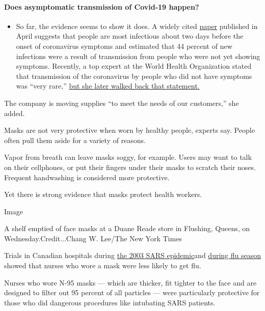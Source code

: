 \begin{itemize}
{  \paragraph{Does asymptomatic transmission of Covid-19
  happen?}\label{does-asymptomatic-transmission-of-covid-19-happen}}

  \begin{itemize}
  \tightlist
  \item
    So far, the evidence seems to show it does. A widely cited
    \href{https://www.nature.com/articles/s41591-020-0869-5}{paper}
    published in April suggests that people are most infectious about
    two days before the onset of coronavirus symptoms and estimated that
    44 percent of new infections were a result of transmission from
    people who were not yet showing symptoms. Recently, a top expert at
    the World Health Organization stated that transmission of the
    coronavirus by people who did not have symptoms was ``very rare,''
    \href{https://www.nytimes.com/2020/06/09/world/coronavirus-updates.html?action=click\&pgtype=Article\&state=default\&region=MAIN_CONTENT_3\&context=storylines_faq\#link-1f302e21}{but
    she later walked back that statement.}
  \end{itemize}
\end{itemize}

The company is moving supplies ``to meet the needs of our customers,''
she added.

Masks are not very protective when worn by healthy people, experts say.
People often pull them aside for a variety of reasons.

Vapor from breath can leave masks soggy, for example. Users may want to
talk on their cellphones, or put their fingers under their masks to
scratch their noses. Frequent handwashing is considered more protective.

Yet there is strong evidence that masks protect health workers.

Image

A shelf emptied of face masks at a Duane Reade store in Flushing,
Queens, on Wednesday.Credit...Chang W. Lee/The New York Times

Trials in Canadian hospitals during
\href{https://www.ncbi.nlm.nih.gov/pmc/articles/PMC3322898/}{the 2003
SARS epidemic}and
\href{https://jamanetwork.com/journals/jama/fullarticle/184819}{during
flu season} showed that nurses who wore a mask were less likely to get
flu.

Nurses who wore N-95 masks --- which are thicker, fit tighter to the
face and are designed to filter out 95 percent of all particles --- were
particularly protective for those who did dangerous procedures like
intubating SARS patients.

